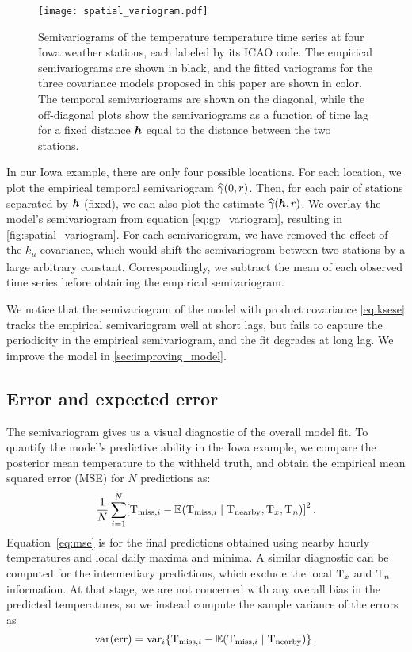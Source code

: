 \begin{figure}[!tbp]
\centering
\texttt{[image: spatial\_variogram.pdf]}
\caption{\label{fig:spatial_variogram}
    Semivariograms of the temperature temperature time series at four Iowa weather stations, each labeled by its ICAO code.
    The empirical semivariograms are shown in black, and the fitted variograms for the three covariance models proposed in this paper are shown in color.
    The temporal semivariograms are shown on the diagonal, while the off-diagonal plots show the semivariograms as a function of time lag for a fixed distance \(\bm{h}\) equal to the distance between the two stations.
}
\end{figure}

In our Iowa example, there are only four possible locations. For each location, we plot the empirical temporal semivariogram \(\widehat\gamma\del{0,r}\). Then, for each pair of stations separated by \(\bm{h}\) (fixed), we can also plot the estimate \(\widehat\gamma\del{\hvec,r}\). 
We overlay the model's semivariogram from equation \autoref{eq:gp_variogram}, resulting in \autoref{fig:spatial_variogram}.
For each semivariogram, we have removed the effect of the \(k_\mu\) covariance, which would shift the semivariogram between two stations by a large arbitrary constant.
Correspondingly, we subtract the mean of each observed time series before obtaining the empirical semivariogram.

We notice that the semivariogram of the model with product covariance \autoref{eq:ksese} tracks the empirical semivariogram well at short lags, but fails to capture the periodicity in the empirical semivariogram, and the fit degrades at long lag. We improve the model in \autoref{sec:improving_model}.

\subsection{Error and expected error}

The semivariogram gives us a visual diagnostic of the overall model fit. 
To quantify the model's predictive ability in the Iowa example, we compare the posterior mean temperature to the withheld truth, and obtain the empirical mean squared error (MSE) for $N$ predictions as:
\begin{equation}
    \label{eq:mse}
    \frac{1}{N} \sum_{i=1}^N \sbr{
        \Temp_{\miss,i}
        -
        \E\del{\Temp_{\miss,i} \mid \Temp_\obs,\Tx,\Tn}
}^2\,.
\end{equation}
Equation~\autoref{eq:mse} is for the final predictions obtained using nearby hourly temperatures and local daily maxima and minima.
A similar diagnostic can be computed for the intermediary predictions, which exclude the local \(\mathrm{T}_{x}\) and \(\mathrm{T}_{n}\) information.
At that stage, we are not concerned with any overall bias in the predicted temperatures, so we instead compute the sample variance of the errors as
\begin{equation}
    \var\del{\error} = \var_i \cbr{
        \Temp_{\miss,i}
        -
        \E\del{\Temp_{\miss,i} \mid \Temp_\obs}
    }\,.
    \label{eq:varerr}
\end{equation}

